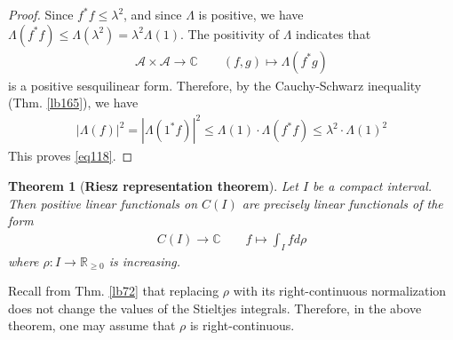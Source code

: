 \documentclass[12pt,b5paper,notitlepage]{article}
\theoremstyle{definition}
\theoremstyle{plain}
\newtheorem{thm}[df]{Theorem}
\newcommand{\scr}{\mathscr}
\newcommand{\Cbb}{\mathbb C}
\newcommand{\Rbb}{\mathbb R}
\numberwithin{equation}{section}
\begin{document}
\begin{proof}
Since $f^*f\leq\lambda^2$, and since $\Lambda$ is positive, we have $\Lambda(f^*f)\leq\Lambda(\lambda^2)=\lambda^2\Lambda(1)$. The positivity of $\Lambda$ indicates that
\begin{gather}
\scr A\times\scr A\rightarrow\Cbb\qquad (f,g)\mapsto\Lambda(f^*g)
\end{gather}
is a positive sesquilinear form. Therefore, by the Cauchy-Schwarz inequality (Thm. \ref{lb165}), we have
\begin{align*}
|\Lambda(f)|^2=|\Lambda(1^*f)|^2\leq\Lambda(1)\cdot\Lambda(f^*f)\leq\lambda^2\cdot\Lambda(1)^2
\end{align*}
This proves \eqref{eq118}. 
\end{proof}



\begin{thm}[\textbf{Riesz representation theorem}]\label{lb206}
Let $I$ be a compact interval. Then positive linear functionals on $C(I)$ are precisely linear functionals of the form
\begin{align*}
C(I)\rightarrow\Cbb\qquad f\mapsto \int_Ifd\rho
\end{align*}
where $\rho:I\rightarrow\Rbb_{\geq0}$ is increasing.
\end{thm}

Recall from Thm. \ref{lb72} that replacing $\rho$ with its right-continuous normalization does not change the values of the Stieltjes integrals. Therefore, in the above theorem, one may assume that $\rho$ is right-continuous.
\end{document}
